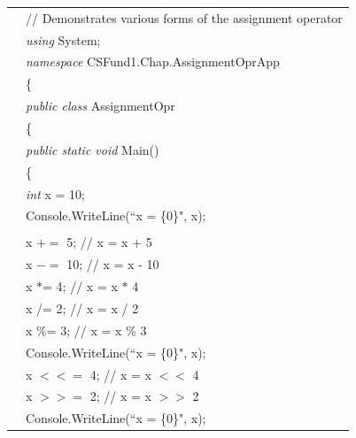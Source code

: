 \renewcommand{\baselinestretch}{0.8}
\begin{program}
\begin{tabular}{>{\codelinenumfont}l>{\codelistingfont}l}

1 & // Demonstrates various forms of the assignment operator\\
2 & \emph{using} System; \\
3 & \emph{namespace} CSFund1.Chap\thechapter.AssignmentOprApp \\
4 & \{\\
5 &  \hspace{0.2in} \emph{public class} AssignmentOpr\\
6 &  \hspace{0.2in} \{\\
7 &  \hspace{0.4in} \emph{public static void} Main()\\
8 &  \hspace{0.4in} \{\\
9 &  \hspace{0.6in} \emph{int} x = 10;\\
10 &  \hspace{0.6in} Console.WriteLine(``x = \{0\}", x);\\
11 & \\
12 &  \hspace{0.6in} x $+\!=$ 5;     \hspace{0.4in} // x = x + 5\\
13 &  \hspace{0.6in} x $-\!=$ 10;    \hspace{0.4in} // x = x - 10\\
14 &  \hspace{0.6in} x $\ast$= 4;     \hspace{0.4in} // x = x $\ast$ 4\\
15 &  \hspace{0.6in} x /= 2;     \hspace{0.4in} // x = x / 2\\
16 &  \hspace{0.6in} x \%= 3;     \hspace{0.4in} // x = x \% 3\\
17 &  \hspace{0.6in} Console.WriteLine(``x = \{0\}", x);\\

18 &  \hspace{0.6in} x $<\!<\!=$ 4;    \hspace{0.4in} // x = x $<\!<$ 4\\
19 &  \hspace{0.6in} x $>\!>\!=$ 2;    \hspace{0.4in} // x = x $>\!>$ 2\\
20 &  \hspace{0.6in} Console.WriteLine(``x = \{0\}", x);\\


\end{tabular}
\end{program}
